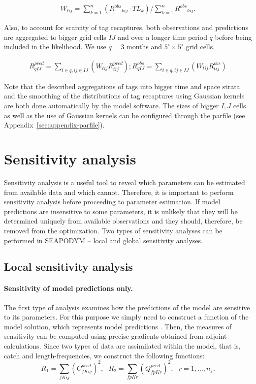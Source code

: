 \begin{align*}
W_{tij}=\sum^{n}_{k=1} \left({R^{obs}}_{kij} \cdot TL_{k}\right) / \sum^{n}_{k=1} {R^{obs}}_{kij}.
\end{align*}

Also, to account for scarcity of tag recaptures, both observations and predictions are aggregated to bigger grid cells $IJ$ and over a longer time period $q$ before being included in the likelihood. We use $q=3$ months and $5^{\circ} \times 5^{\circ}$ grid cells.

\begin{align*}
R^{pred}_{qIJ}=\sum_{t \in q, ij \in IJ} \left(W_{tij} R^{pred}_{tij}\right); 
R^{obs}_{qIJ}=\sum_{t \in q, ij \in IJ} \left(W_{tij} R^{obs}_{tij}\right)
\end{align*}

Note that the described aggregations of tags into bigger time and space strata and the smoothing of the distributions of tag recaptures using Gaussian kernels are both done automatically by the model software. The sizes of bigger $I,J$ cells as well as the use of Gaussian kernels can be configured through the parfile (see Appendix~\ref{sec:appendix-parfile}).

\section{Sensitivity analysis}\label{sec:SA}

Sensitivity analysis is a useful tool to reveal which parameters can be estimated from available data and which cannot. Therefore, it is important to perform sensitivity analysis before proceeding to parameter estimation. If model predictions are insensitive to some parameters, it is unlikely that they will be determined uniquely from available observations and they should, therefore, be removed from the optimization. Two types of sensitivity analyses can be performed in SEAPODYM -- local and global sensitivity analyses.

\subsection{Local sensitivity analysis}\label{sec:local-sa}

\paragraph{Sensitivity of model predictions only.} The first type of analysis examines how the predictions of the model are sensitive to its parameters. For this purpose we simply need to construct a function of the model solution, which represents model predictions \citep{Worley}. Then, the measures of sensitivity can be computed using precise gradients obtained from adjoint calculations. Since two types of data are assimilated within the model, that is, catch and length-frequencies, we construct the following functions:
\begin{equation}
	R_1  = \sum\limits_{fKij} \left(C^{pred}_{fKij}\right)^2, \mbox{ }
	R_2  = \sum\limits_{fpKr} \left(Q^{pred}_{fpKr}\right)^2, \mbox{ } r=1,\dots,n_f.
\end{equation}

